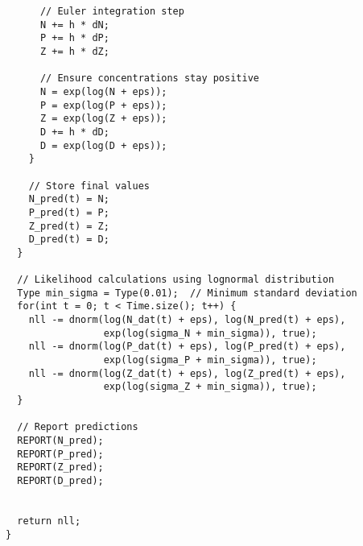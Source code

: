 \begin{lstlisting}
      // Euler integration step
      N += h * dN;
      P += h * dP;
      Z += h * dZ;
      
      // Ensure concentrations stay positive
      N = exp(log(N + eps));
      P = exp(log(P + eps));
      Z = exp(log(Z + eps));
      D += h * dD;
      D = exp(log(D + eps));
    }
    
    // Store final values
    N_pred(t) = N;
    P_pred(t) = P;
    Z_pred(t) = Z;
    D_pred(t) = D;
  }
  
  // Likelihood calculations using lognormal distribution
  Type min_sigma = Type(0.01);  // Minimum standard deviation
  for(int t = 0; t < Time.size(); t++) {
    nll -= dnorm(log(N_dat(t) + eps), log(N_pred(t) + eps), 
                 exp(log(sigma_N + min_sigma)), true);
    nll -= dnorm(log(P_dat(t) + eps), log(P_pred(t) + eps), 
                 exp(log(sigma_P + min_sigma)), true);
    nll -= dnorm(log(Z_dat(t) + eps), log(Z_pred(t) + eps), 
                 exp(log(sigma_Z + min_sigma)), true);
  }
  
  // Report predictions
  REPORT(N_pred);
  REPORT(P_pred);
  REPORT(Z_pred);
  REPORT(D_pred);

  
  return nll;
}
\end{lstlisting}

